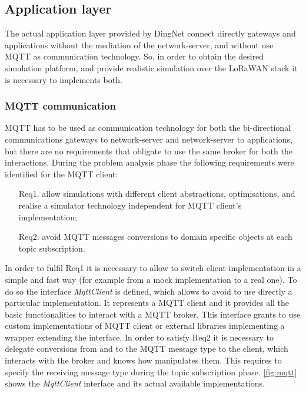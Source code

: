 \subsection*{Application layer}
The actual application layer provided by DingNet connect directly gateways and applications without the mediation of the network-server, and without use MQTT as communication technology.
So, in order to obtain the desired simulation platform, and provide realistic simulation over the LoRaWAN stack it is necessary to implements both.

\subsubsection{MQTT communication}
MQTT has to be used as communication technology for both the bi-directional communications gateways to network-server and network-server to applications, but there are no requirements that obligate to use the same broker for both the interactions. 
During the problem analysis phase the following requirements were identified for the MQTT client:
\begin{itemize}
    \item[Req1.] allow simulations with different client abstractions, optimisations, and realise a simulator technology independent for MQTT client's implementation;
    \item[Req2.] avoid MQTT messages conversions to domain specific objects at each topic \mbox{subscription}.
\end{itemize}
In order to fulfil Req1 it is necessary to allow to switch client implementation in a simple and fast way (for example from a mock implementation to a real one).
To do so the interface \mbox{\textit{MqttClient}} is defined, which allows to avoid to use directly a particular implementation.
It represents a MQTT client and it provides all the basic functionalities to interact with a MQTT broker. 
This interface grants to use custom implementations of MQTT client or external libraries implementing a wrapper extending the interface.
% 
In order to satisfy Req2 it is necessary to delegate conversions from and to the MQTT message type to the client, which interacts with the broker and knows how manipulates them.
% 
This requires to specify the receiving message type during the topic subscription phase.
% 
\autoref{fig:mqtt} shows the \mbox{\textit{MqttClient}} interface and its actual available implementations.
